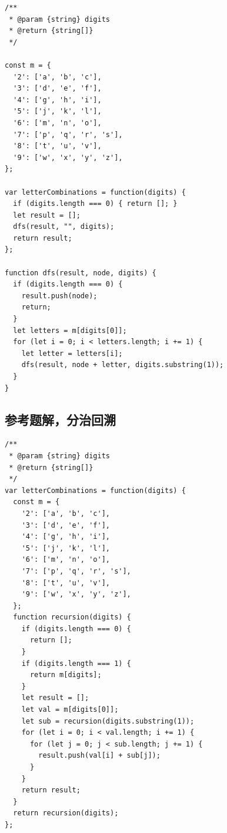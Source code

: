 \begin{verbatim}
/**
 * @param {string} digits
 * @return {string[]}
 */

const m = {
  '2': ['a', 'b', 'c'],
  '3': ['d', 'e', 'f'],
  '4': ['g', 'h', 'i'],
  '5': ['j', 'k', 'l'],
  '6': ['m', 'n', 'o'],
  '7': ['p', 'q', 'r', 's'],
  '8': ['t', 'u', 'v'],
  '9': ['w', 'x', 'y', 'z'],
};

var letterCombinations = function(digits) {
  if (digits.length === 0) { return []; }
  let result = [];
  dfs(result, "", digits);
  return result;
};

function dfs(result, node, digits) {
  if (digits.length === 0) {
    result.push(node);
    return;
  }
  let letters = m[digits[0]];
  for (let i = 0; i < letters.length; i += 1) {
    let letter = letters[i];
    dfs(result, node + letter, digits.substring(1));
  }
}
\end{verbatim}

\subsection{参考题解，分治回溯}

\begin{verbatim}
/**
 * @param {string} digits
 * @return {string[]}
 */
var letterCombinations = function(digits) {
  const m = {
    '2': ['a', 'b', 'c'],
    '3': ['d', 'e', 'f'],
    '4': ['g', 'h', 'i'],
    '5': ['j', 'k', 'l'],
    '6': ['m', 'n', 'o'],
    '7': ['p', 'q', 'r', 's'],
    '8': ['t', 'u', 'v'],
    '9': ['w', 'x', 'y', 'z'],
  };
  function recursion(digits) {
    if (digits.length === 0) {
      return [];
    }
    if (digits.length === 1) {
      return m[digits];
    }
    let result = [];
    let val = m[digits[0]];
    let sub = recursion(digits.substring(1));
    for (let i = 0; i < val.length; i += 1) {
      for (let j = 0; j < sub.length; j += 1) {
        result.push(val[i] + sub[j]);
      }
    }
    return result;
  }
  return recursion(digits);
};
\end{verbatim}
